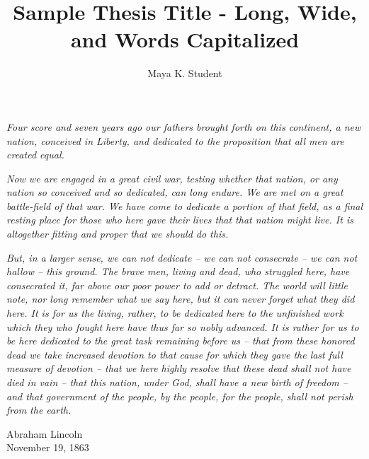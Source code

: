 \documentclass[11pt, fullpage]{article}
\begin{document}
\title{Sample Thesis Title - Long, Wide, and Words Capitalized}
\author{Maya K. Student}
    \cochairfalse
    \threereaderstrue
    \fourreaderstrue
    \fivereadersfalse
    \figurelisttrue
    \tablelistfalse
\makecoverpages

\begin{dedication}
\textit{Four score and seven years ago our fathers brought forth on this continent, a new nation, conceived in Liberty, and dedicated to the proposition that all men are created equal.}

\textit{Now we are engaged in a great civil war, testing whether that nation, or any nation so conceived and so dedicated, can long endure. We are met on a great battle-field of that war. We have come to dedicate a portion of that field, as a final resting place for those who here gave their lives that that nation might live. It is altogether fitting and proper that we should do this.}

\textit{But, in a larger sense, we can not dedicate -- we can not consecrate -- we can not hallow -- this ground. The brave men, living and dead, who struggled here, have consecrated it, far above our poor power to add or detract. The world will little note, nor long remember what we say here, but it can never forget what they did here. It is for us the living, rather, to be dedicated here to the unfinished work which they who fought here have thus far so nobly advanced. It is rather for us to be here dedicated to the great task remaining before us -- that from these honored dead we take increased devotion to that cause for which they gave the last full measure of devotion -- that we here highly resolve that these dead shall not have died in vain -- that this nation, under God, shall have a new birth of freedom -- and that government of the people, by the people, for the people, shall not perish from the earth.}

\begin{flushright}
Abraham Lincoln \\
November 19, 1863
\end{flushright}
\end{dedication}
\end{document}

